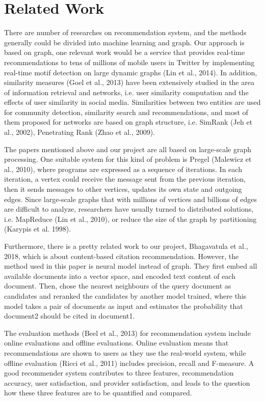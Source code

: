\section{Related Work}

There are number of researches on recommendation system, and the methods generally could be divided into machine learning and graph. Our approach is based on graph, one relevant work would be 
a service that provides real-time recommendations to tens of millions of mobile users in Twitter by implementing real-time motif detection on large dynamic graphs (Lin et al., 2014). In addition, similarity measures (Goel et al., 2013) have been extensively studied in the area of information retrieval and networks, i.e. user similarity computation and the effects of user similarity in social media. Similarities between two entities are used for community detection, similarity search and recommendations, and most of them proposed for networks are based on graph structure, i.e. SimRank (Jeh et al., 2002), Penetrating Rank (Zhao et al., 2009). 

The papers mentioned above and our project are all based on large-scale graph processing. One suitable system for this kind of problem is Pregel (Malewicz et al., 2010), where programs are expressed as a sequence of iterations. In each iteration, a vertex could receive the message sent from the previous iteration, then it sends messages to other vertices, updates its own state and outgoing edges. Since large-scale graphs that with millions of vertices and billions of edges are difficult to analyze, researchers have usually turned to distributed solutions, i.e. MapReduce (Lin et al., 2010), or reduce the size of the graph by partitioning (Karypis et al. 1998).

Furthermore, there is a pretty related work to our project, Bhagavatula et al., 2018, which is about content-based citation recommendation. However, the method used in this paper is neural model instead of graph. They first embed all available documents into a vector space, and encoded text content of each document. Then, chose the nearest neighbours of the query document as candidates and reranked the candidates by another model trained, where this model takes a pair of documents as input and estimates the probability that document2 should be cited in document1.

The evaluation methods (Beel et al., 2013) for recommendation system include online evaluations and offline evaluations. Online evaluation means that recommendations are shown to users as they use the real-world system, while offline evaluation (Ricci et al., 2011) includes precision, recall and F-measure. A good recommender system contributes to three features, recommendation accuracy, user satisfaction, and provider satisfaction, and leads to the question how these three features are to be quantified and compared.